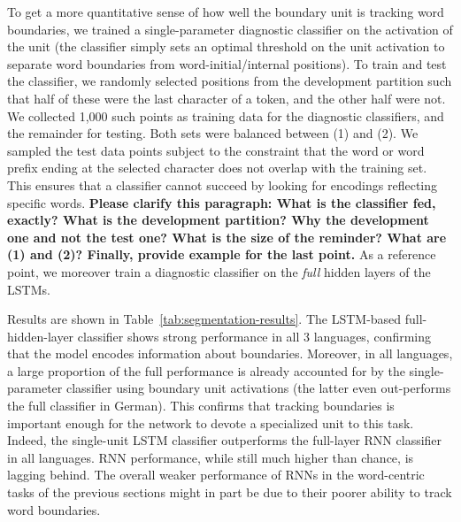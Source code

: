 To get a more quantitative sense of how well the boundary unit is
tracking word boundaries, we trained a single-parameter diagnostic
classifier on the activation of the unit (the classifier simply sets
an optimal threshold on the unit activation to separate word
boundaries from word-initial/internal positions). To train and test
the classifier, we randomly selected positions from the development
partition such that half of these were the last character of a token,
and the other half were not.  We collected 1,000 such points as
training data for the diagnostic classifiers, and the remainder for
testing.  Both sets were balanced between (1) and (2).  We sampled the
test data points subject to the constraint that the word or word
prefix ending at the selected character does not overlap with the
training set.  This ensures that a classifier cannot succeed by
looking for encodings reflecting specific words. \textbf{Please
  clarify this paragraph: What is the classifier fed, exactly? What is
  the development partition? Why the development one and not the test
  one?  What is the size of the reminder? What are (1) and (2)?
  Finally, provide example for the last point.} As a reference point,
we moreover train a diagnostic classifier on the \emph{full} hidden
layers of the LSTMs.

Results are shown in Table~\ref{tab:segmentation-results}. The
LSTM-based full-hidden-layer classifier shows strong performance in
all 3 languages, confirming that the model encodes information about
boundaries. Moreover, in all languages, a large proportion of the full
performance is already accounted for by the single-parameter
classifier using boundary unit activations (the latter even
out-performs the full classifier in German). This confirms that
tracking boundaries is important enough for the network to devote a
specialized unit to this task. %
Indeed, the single-unit LSTM classifier outperforms the full-layer RNN
classifier in all languages. RNN performance, while still much higher
than chance, is lagging behind. The overall weaker performance of RNNs
in the word-centric tasks of the previous sections might in part be
due to their poorer ability to track word boundaries. %

